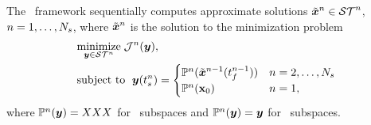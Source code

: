The \methodAcronym\ framework sequentially computes approximate solutions
$\tilde{\boldsymbol x}^{n}\in\mathcal{ ST }^n$, $n=1,\ldots,N_s$, where 
$\tilde{\boldsymbol x}^{n}$ is the solution to the
minimization problem
\begin{equation}\label{eq:tclsrm}
\begin{split}
      &\underset{\boldsymbol y \in \mathcal{ ST }^n}{\text{minimize}} \; \mathcal{J}^n(\boldsymbol y), \\
			&\text{subject to } \;  \boldsymbol y(t_s^{n}) =
\begin{cases}\mathbb{P}^n (\tilde{\boldsymbol x}^{n-1}(t_f^{n-1})) & n = 2,\ldots,N_s \\
\mathbb{P}^n( {{\mathbf{x}}_0})& n=1, \end{cases} 
\end{split}
\end{equation}
where 
$\mathbb{P}^n (\boldsymbol y) = XXX$  for \spatialAcronym\ subspaces
and
$\mathbb{P}^n (\boldsymbol y) = \boldsymbol y$ for \spaceTimeAcronym\ subspaces.
